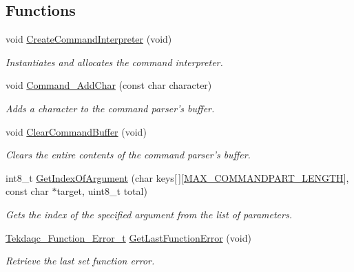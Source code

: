 \subsection*{Functions}
\begin{DoxyCompactItemize}
\item 
void \hyperlink{group__command__interpreter_ga8a32c543f87d40b158c3007b8ab8b525}{Create\-Command\-Interpreter} (void)
\begin{DoxyCompactList}\small\item\em Instantiates and allocates the command interpreter. \end{DoxyCompactList}\item 
void \hyperlink{group__command__interpreter_gae17b8153644216734412b48e52b760d3}{Command\-\_\-\-Add\-Char} (const char character)
\begin{DoxyCompactList}\small\item\em Adds a character to the command parser's buffer. \end{DoxyCompactList}\item 
void \hyperlink{group__command__interpreter_ga1958dfed537e8e071b08b488b5911575}{Clear\-Command\-Buffer} (void)
\begin{DoxyCompactList}\small\item\em Clears the entire contents of the command parser's buffer. \end{DoxyCompactList}\item 
int8\-\_\-t \hyperlink{group__command__interpreter_ga40f7ab5c778b33671146878fe6bd8191}{Get\-Index\-Of\-Argument} (char keys\mbox{[}$\,$\mbox{]}\mbox{[}\hyperlink{group__command__parser_ga6147771b5547853f33eb838895e3d5a2}{M\-A\-X\-\_\-\-C\-O\-M\-M\-A\-N\-D\-P\-A\-R\-T\-\_\-\-L\-E\-N\-G\-T\-H}\mbox{]}, const char $\ast$target, uint8\-\_\-t total)
\begin{DoxyCompactList}\small\item\em Gets the index of the specified argument from the list of parameters. \end{DoxyCompactList}\item 
\hyperlink{group__tekdaqc__error_ga19df05d919ecca7a7501b35ae9080a32}{Tekdaqc\-\_\-\-Function\-\_\-\-Error\-\_\-t} \hyperlink{group__command__interpreter_ga507d74a3df649ff693df84ae46e9b696}{Get\-Last\-Function\-Error} (void)
\begin{DoxyCompactList}\small\item\em Retrieve the last set function error. \end{DoxyCompactList}\end{DoxyCompactItemize}
